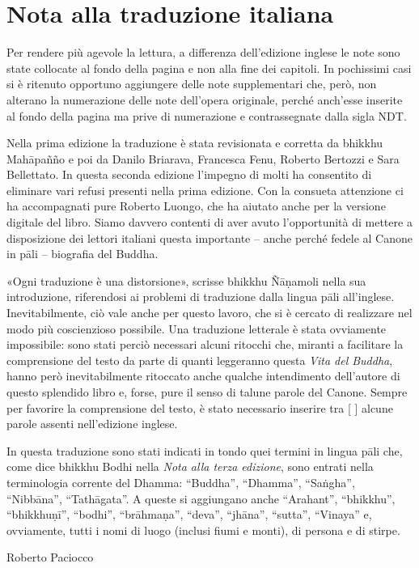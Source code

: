 \chapter{Nota alla traduzione italiana}

Per rendere più agevole la lettura, a differenza dell’edizione inglese
le note sono state collocate al fondo della pagina e non alla fine dei
capitoli. In pochissimi casi si è ritenuto opportuno aggiungere delle
note supplementari che, però, non alterano la numerazione delle note
dell’opera originale, perché anch’esse inserite al fondo della pagina ma
prive di numerazione e contrassegnate dalla sigla NDT.

Nella prima edizione la traduzione è stata
revisionata e corretta da bhikkhu Mahāpañño e poi da Danilo Briarava,
Francesca Fenu, Roberto Bertozzi e Sara Bellettato. In questa seconda edizione
l’impegno di molti ha consentito di eliminare vari refusi presenti nella prima
edizione. Con la consueta attenzione ci ha accompagnati pure Roberto Luongo,
che ha aiutato anche per la versione digitale del libro. Siamo davvero contenti
di aver avuto l’opportunità di mettere a disposizione dei lettori italiani questa
importante – anche perché fedele al Canone in pāli – biografia del Buddha.

«Ogni traduzione è una distorsione», scrisse bhikkhu Ñāṇamoli nella sua
introduzione, riferendosi ai problemi di traduzione dalla lingua pāli
all’inglese. Inevitabilmente, ciò vale anche per questo lavoro, che si è
cercato di realizzare nel modo più coscienzioso possibile. Una
traduzione letterale è stata ovviamente impossibile: sono stati perciò
necessari alcuni ritocchi che, miranti a facilitare la comprensione
del testo da parte di quanti leggeranno questa \emph{Vita del Buddha}, hanno
però inevitabilmente ritoccato anche qualche intendimento dell’autore di
questo splendido libro e, forse, pure il senso di talune parole del
Canone. Sempre per favorire la comprensione del testo, è stato
necessario inserire tra [ ] alcune parole assenti nell’edizione inglese.

\enlargethispage{\baselineskip}

In questa traduzione sono stati indicati in tondo quei termini in lingua
pāli che, come dice bhikkhu Bodhi nella \emph{Nota alla terza edizione}, sono
entrati nella terminologia corrente del Dhamma: “Buddha”, “Dhamma”,
“Saṅgha”, “Nibbāna”, “Tathāgata”. A queste si aggiungano anche
“Arahant”, “bhikkhu”, “bhikkhuṇī”, “bodhi”, “brāhmaṇa”, “deva”, “jhāna”,
“sutta”, “Vinaya” e, ovviamente, tutti i nomi di luogo (inclusi fiumi e
monti), di persona e di stirpe.

{\raggedleft
Roberto Paciocco
\par}

